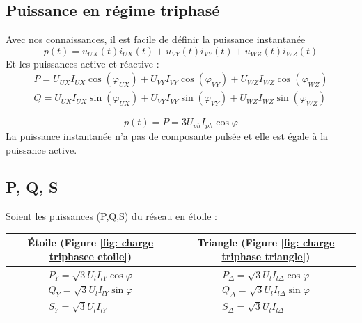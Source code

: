 \documentclass[12pt,a4paper]{article}
\begin{document}
\subsection[Puissance]{Puissance en régime triphasé}
Avec nos connaissances, il est facile de définir la puissance instantanée 
\begin{equation}
	p(t) = u_{UX}(t)i_{UX}(t) + u_{VY}(t)i_{VY}(t) + u_{WZ}(t)i_{WZ}(t)
\end{equation}
Et les puissances active et réactive :
\begin{equation}
	\begin{array}{l}
		P = U_{UX}I_{UX}\cos(\varphi_{UX}) + U_{VY}I_{VY}\cos(\varphi_{VY}) + U_{WZ}I_{WZ}\cos(\varphi_{WZ})\\
		Q = U_{UX}I_{UX}\sin(\varphi_{UX}) + U_{VY}I_{VY}\sin(\varphi_{VY}) + U_{WZ}I_{WZ}\sin(\varphi_{WZ})
	\end{array}
\end{equation}

\begin{boite}
	\begin{equation}
		p(t) = P = 3U_{ph}I_{ph}\cos\varphi
	\end{equation}
	La puissance instantanée n'a pas de composante pulsée et elle est égale à la puissance active.
\end{boite}

\subsection{P, Q, S}
Soient les puissances (P,Q,S) du réseau en étoile :
\begin{table}[!h]
	\centering
	\begin{tabular}{c | c}
		Étoile (Figure \ref{fig: charge triphasee etoile}) & Triangle (Figure \ref{fig: charge triphase triangle})\\
		\hline
		$\begin{array}{l}
			P_Y = \sqrt{3}U_lI_{lY} \cos\varphi\\
			Q_Y = \sqrt{3}U_lI_{lY} \sin\varphi\\
			S_Y = \sqrt{3}U_lI_{lY}
		\end{array}$ 
		&
		$\begin{array}{l}
			P_\Delta = \sqrt{3}U_lI_{l\Delta} \cos\varphi\\
			Q_\Delta = \sqrt{3}U_lI_{l\Delta} \sin\varphi\\
			S_\Delta = \sqrt{3}U_lI_{l\Delta}
		\end{array}$ 
	\end{tabular}
\end{table}
\end{document}
